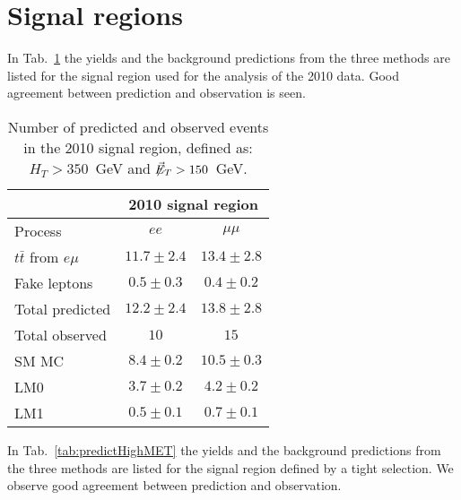 \section{Signal regions}

In Tab.~\ref{tab:predict2010} the yields and the background predictions
from the three methods are listed for the signal region used for the analysis
of the 2010 data. Good agreement between prediction and
observation is seen.

\begin{table}[hbt]
\begin{center}
\caption{\label{tab:predict2010}Number of predicted and observed events in the 2010 signal region, 
    defined as: $H_T > 350$~GeV and $\not\!\!\vec{E}_{T} > 150$~GeV.}
\begin{tabular}{l|cc}
\hline
                       & \multicolumn{2}{c}{2010 signal region}               \\
\hline 
Process                & $ee$          & $\mu\mu$        \\
\hline
$t\bar{t}$ from $e\mu$ & $11.7\pm 2.4$ & $13.4\pm 2.8$   \\
Fake leptons           & $0.5\pm 0.3$  & $0.4\pm0.2$                  \\
\hline
Total predicted        & $12.2\pm 2.4$ & $13.8 \pm 2.8$  \\
\hline\hline
Total observed         & $10$          & $15$          \\
\hline \hline
SM MC         & $8.4\pm 0.2$  & $10.5 \pm 0.3$    \\
LM0                    &  $3.7\pm0.2$  & $4.2\pm0.2$     \\
LM1                    &  $0.5\pm0.1$  & $0.7\pm0.1$     \\

\hline
\end{tabular}
\end{center}
\end{table}


In Tab.~\ref{tab:predictHighMET} the yields and the background predictions
from the three methods are listed for the signal region defined by a tight
\MET selection. We observe good agreement between prediction
and observation.

